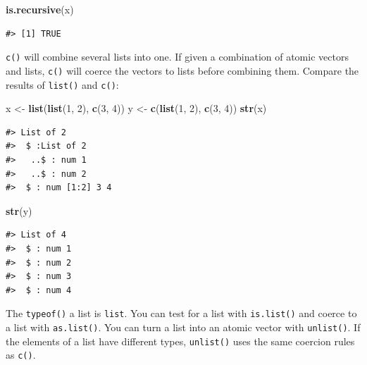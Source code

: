 \documentclass[]{book}
\newenvironment{Shaded}{\begin{snugshade}}{\end{snugshade}}
\newcommand{\KeywordTok}[1]{\textcolor[rgb]{0.13,0.29,0.53}{\textbf{#1}}}
\newcommand{\DecValTok}[1]{\textcolor[rgb]{0.00,0.00,0.81}{#1}}
\newcommand{\StringTok}[1]{\textcolor[rgb]{0.31,0.60,0.02}{#1}}
\newcommand{\NormalTok}[1]{#1}
\theoremstyle{definition}
\theoremstyle{definition}
\theoremstyle{definition}
\theoremstyle{remark}
\begin{document}
\begin{Shaded}
\begin{Highlighting}[]
\KeywordTok{is.recursive}\NormalTok{(x)}
\end{Highlighting}
\end{Shaded}

\begin{verbatim}
#> [1] TRUE
\end{verbatim}

\texttt{c()} will combine several lists into one. If given a combination
of atomic vectors and lists, \texttt{c()} will coerce the vectors to
lists before combining them. Compare the results of \texttt{list()} and
\texttt{c()}:

\begin{Shaded}
\begin{Highlighting}[]
\NormalTok{x <-}\StringTok{ }\KeywordTok{list}\NormalTok{(}\KeywordTok{list}\NormalTok{(}\DecValTok{1}\NormalTok{, }\DecValTok{2}\NormalTok{), }\KeywordTok{c}\NormalTok{(}\DecValTok{3}\NormalTok{, }\DecValTok{4}\NormalTok{))}
\NormalTok{y <-}\StringTok{ }\KeywordTok{c}\NormalTok{(}\KeywordTok{list}\NormalTok{(}\DecValTok{1}\NormalTok{, }\DecValTok{2}\NormalTok{), }\KeywordTok{c}\NormalTok{(}\DecValTok{3}\NormalTok{, }\DecValTok{4}\NormalTok{))}
\KeywordTok{str}\NormalTok{(x)}
\end{Highlighting}
\end{Shaded}

\begin{verbatim}
#> List of 2
#>  $ :List of 2
#>   ..$ : num 1
#>   ..$ : num 2
#>  $ : num [1:2] 3 4
\end{verbatim}

\begin{Shaded}
\begin{Highlighting}[]
\KeywordTok{str}\NormalTok{(y)}
\end{Highlighting}
\end{Shaded}

\begin{verbatim}
#> List of 4
#>  $ : num 1
#>  $ : num 2
#>  $ : num 3
#>  $ : num 4
\end{verbatim}

The \texttt{typeof()} a list is \texttt{list}. You can test for a list
with \texttt{is.list()} and coerce to a list with \texttt{as.list()}.
You can turn a list into an atomic vector with \texttt{unlist()}. If the
elements of a list have different types, \texttt{unlist()} uses the same
coercion rules as \texttt{c()}.
\end{document}
